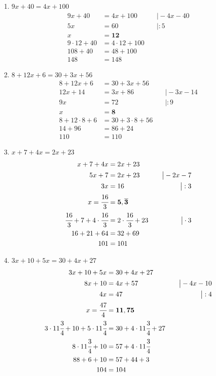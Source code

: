\documentclass[a4paper,10pt]{article} %
\begin{document}
\begin{enumerate}[label=\alph*)]
  \item \(9x + 40 = 4x + 100\)
  \[
  \begin{aligned}
    9x + 40 &= 4x + 100 &\quad\big| -4x - 40 \\
    5x &= 60 &\quad\big| : 5 \\
    x &= \mathbf{12} \\
    9 \cdot 12 + 40 &= 4 \cdot 12 + 100 \\
    108 + 40 &= 48 + 100 \\
    148 &= 148
  \end{aligned}
  \]

  \item \(8 + 12x + 6 = 30 + 3x + 56\)
  \[
  \begin{aligned}
    8 + 12x + 6 &= 30 + 3x + 56 \\
    12x + 14 &= 3x + 86 &\quad\big| -3x - 14 \\
    9x &= 72 &\quad\big| : 9 \\
    x &= \mathbf{8} \\
    8 + 12 \cdot 8 + 6 &= 30 + 3 \cdot 8 + 56 \\
    14 + 96 &= 86 + 24 \\
    110 &= 110
  \end{aligned}
  \]

  \item \(x + 7 + 4x = 2x + 23\)
  \[
  \begin{aligned}
    x + 7 + 4x &= 2x + 23 \\
    5x + 7 &= 2x + 23 &\quad\big| -2x - 7 \\
    3x &= 16 &\quad\big| : 3 \\
    x = \cfrac{16}{3} &= \mathbf{5,\overline{3}} \\
    \cfrac{16}{3} + 7 + 4 \cdot \cfrac{16}{3} &= 2 \cdot \cfrac{16}{3} + 23 &\quad\big| \cdot 3\\
    16 + 21 + 64 &= 32 + 69 \\
    101 &= 101
  \end{aligned}
  \]

  \item \(3x + 10 + 5x = 30 + 4x + 27\)
  \[
  \begin{aligned}
    3x + 10 + 5x &= 30 + 4x + 27 \\
    8x + 10 &= 4x + 57 &\quad\big| -4x - 10 \\
    4x &= 47 &\quad\big| : 4 \\
    x = \cfrac{47}{4} &= \mathbf{11,75} \\
    3 \cdot 11\cfrac{3}{4} + 10 + 5 \cdot 11\cfrac{3}{4} &= 30 + 4 \cdot 11\cfrac{3}{4} + 27 \\
    8 \cdot 11\cfrac{3}{4} + 10 &= 57 + 4 \cdot 11\cfrac{3}{4} \\
    88 + 6 + 10 &= 57 + 44 + 3 \\
    104 &= 104
  \end{aligned}
  \]


\end{enumerate}
\end{document}

